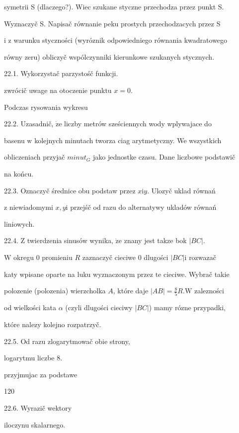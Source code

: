\documentclass[a4paper,12pt]{article}
\begin{document}
symetrii S (dlaczego?). Wiec szukane styczne przechodza przez punkt S.

Wyznaczyč S. Napisač równanie peku prostych przechodzacych przez S

i z warunku styczności (wyróznik odpowiedniego równania kwadratowego

równy zeru) obliczyč wspólczynniki kierunkowe szukanych stycznych.

22.1. Wykorzystač parzystośč funkcji.

zwrócič uwage na otoczenie punktu $x=0.$

Podczas rysowania wykresu

22.2. Uzasadnič, $\dot{\mathrm{z}}\mathrm{e}$ liczby metrów sześciennych wody wplywajace do

basenu $\mathrm{w}$ kolejnych minutach tworza ciag arytmetyczny. We wszystkich

obliczeniach przyjač $minut_{G}$ jako jednostke czasu. Dane liczbowe podstawič

na końcu.

22.3. Oznaczyč średnice obu podstaw przez $x\mathrm{i}y$. Ulozyč uklad równań

$\mathrm{z}$ niewiadomymi $x, y \mathrm{i}$ przejśč od razu do alternatywy ukladów równań

liniowych.

22.4. $\mathrm{Z}$ twierdzenia sinusów wynika, $\dot{\mathrm{z}}\mathrm{e}$ znany jest takze bok $|BC|.$

$\mathrm{W}$ okregu $0$ promieniu $R$ zaznaczyč cieciwe $0$ dlugości $|BC| \mathrm{i}$ rozwazač

katy wpisane oparte na luku wyznaczonym przez $\mathrm{t}\mathrm{e}$ cieciwe. Wybrač takie

polozenie (polozenia) wierzcholka $A$, które daje $|AB|=\displaystyle \frac{8}{5}R. \mathrm{W}$ zalezności

od wielkości kata $\alpha$ (czyli dlugości cieciwy $|BC|$) mamy rózne przypadki,

które nalezy kolejno rozpatrzyč.

22.5. Od razu zlogarytmowač obie strony,

logarytmu liczbe 8.

przyjmujac za podstawe





120

22.6. Wyrazič wektory

iloczynu skalarnego.
\end{document}
